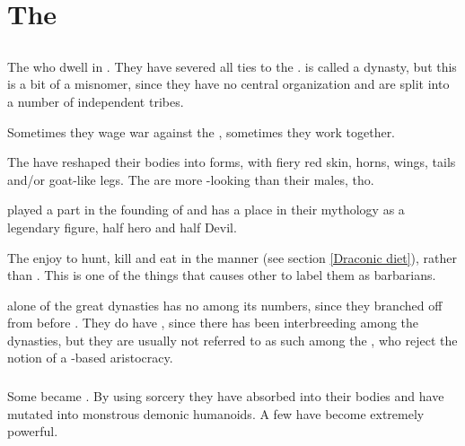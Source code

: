 \chapter{The \Resphain}

















\section{\Baelzerach}
The \daemonic{} \resphain{} who dwell in \Machai{}. 
They have severed all ties to the \banes. 
\Baelzerach{} is called a dynasty, but this is a bit of a misnomer, since they have no central organization and are split into a number of independent tribes. 

Sometimes they wage war against the \dragons, sometimes they work together. 

The \Baelzerach{} have reshaped their bodies into \daemonic{} forms, with fiery red skin, horns, wings, tails and/or goat-like legs. 
The \resviel{} are more \human-looking than their males, tho. 

\Ishnaruchaefir played a part in the founding of \Baelzerach{} and has a place in their mythology as a legendary figure, half hero and half Devil. 

The \Baelzerach{} enjoy to hunt, kill and eat in the \draconic{} manner (see section \ref{Draconic diet}), rather than . 
This is one of the things that causes other \resphain{} to label them as barbarians. 

\Baelzerach{} alone of the great dynasties has no \satharioth{} among its numbers, since they branched off from \KiriathSepher{} before . 
They do have \ketherain, since there has been interbreeding among the dynasties, but they are usually not referred to as such among the \Baelzerach, who reject the notion of a \KiriathSepher{}-based aristocracy. 









\subsection{\Daemoniacs}
\index{\daemoniac}
Some \Baelzerach became \daemoniacs.
By using \draconian sorcery they have absorbed \daemons into their bodies and have mutated into monstrous demonic humanoids.
A few \daemoniacs have become extremely powerful.

